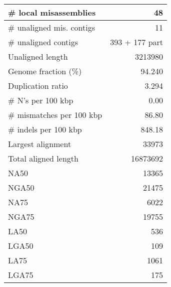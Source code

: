 \documentclass[12pt,a4paper]{article}
\begin{document}
\begin{table}[ht]
\begin{center}
\begin{tabular}{|l*{1}{|r}|}
\# local misassemblies & 48 \\ \hline
\# unaligned mis. contigs & 11 \\ \hline
\# unaligned contigs & 393 + 177 part \\ \hline
Unaligned length & 3213980 \\ \hline
Genome fraction (\%) & 94.240 \\ \hline
Duplication ratio & 3.294 \\ \hline
\# N's per 100 kbp & 0.00 \\ \hline
\# mismatches per 100 kbp & 86.80 \\ \hline
\# indels per 100 kbp & 848.18 \\ \hline
Largest alignment & 33973 \\ \hline
Total aligned length & 16873692 \\ \hline
NA50 & 13365 \\ \hline
NGA50 & 21475 \\ \hline
NA75 & 6022 \\ \hline
NGA75 & 19755 \\ \hline
LA50 & 536 \\ \hline
LGA50 & 109 \\ \hline
LA75 & 1061 \\ \hline
LGA75 & 175 \\ \hline
\end{tabular}
\end{center}
\end{table}
\end{document}
